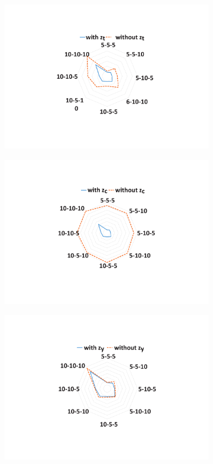 \documentclass[letterpaper]{article} %
\begin{document}
\begin{figure}[!t]
\centering
\begin{subfigure}{0.15\textwidth}
\includegraphics[width = \linewidth]{z_t2.pdf}
\caption{}
\end{subfigure}
\begin{subfigure}{0.15\textwidth}
\includegraphics[width = \linewidth]{z_c2.pdf}
\caption{}
\end{subfigure}
\begin{subfigure}{0.15\textwidth}
\includegraphics[width = \linewidth]{z_y2.pdf}

\end{subfigure}
\end{figure}
\end{document}
